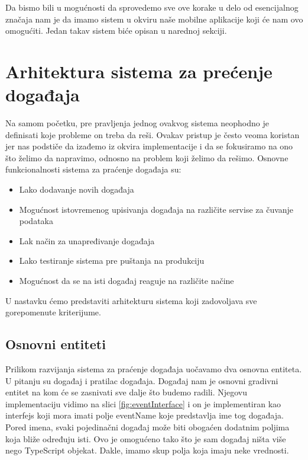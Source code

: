 \documentclass[12pt,oneside]{memoir}
\begin{document}
Da bismo bili u mogućnosti da sprovedemo sve ove korake u delo od esencijalnog značaja nam je da imamo sistem u okviru naše mobilne aplikacije koji će nam ovo omogućiti. Jedan takav sistem biće opisan u narednoj sekciji.

\section{Arhitektura sistema za prećenje događaja}

Na samom početku, pre pravljenja jednog ovakvog sistema neophodno je definisati koje probleme on treba da reši. Ovakav pristup je često veoma koristan jer nas podstiče da izađemo iz okvira implementacije i da se fokusiramo na ono što želimo da napravimo, odnosno na problem koji želimo da rešimo.
\newline
\newline
Osnovne funkcionalnosti sistema za praćenje događaja su:
\begin{itemize}
\item Lako dodavanje novih događaja
\item Mogućnost istovremenog upisivanja događaja na različite servise za čuvanje podataka
\item Lak način za unapređivanje događaja
\item Lako testiranje sistema pre puštanja na produkciju
\item Mogućnost da se na isti događaj reaguje na različite načine 
\end{itemize}

U nastavku ćemo predstaviti arhitekturu sistema koji zadovoljava sve gorepomenute kriterijume.

\subsection{Osnovni entiteti}

Prilikom razvijanja sistema za praćenje događaja uočavamo dva osnovna entiteta. U pitanju su događaj i pratilac događaja. Događaj nam je osnovni gradivni entitet na kom će se zasnivati sve dalje što budemo radili. Njegovu implementaciju vidimo na slici \ref{fig:eventInterface} i on je implementiran kao interfejs koji mora imati polje eventName koje predstavlja ime tog događaja. Pored imena, svaki pojedinačni događaj može biti obogaćen dodatnim poljima koja bliže određuju isti. Ovo je omogućeno tako što je sam događaj ništa više nego TypeScript objekat. Dakle, imamo skup polja koja imaju neke vrednosti. 
\end{document}
